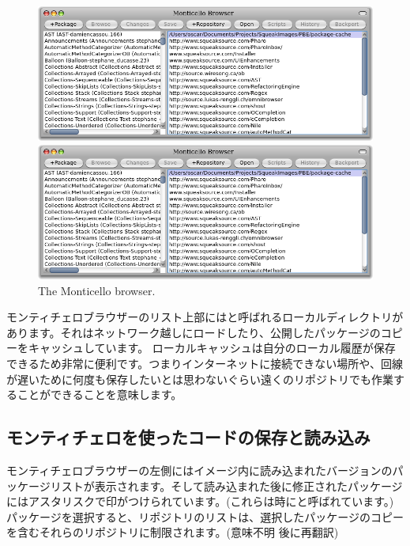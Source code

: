 \documentclass[a4paper,10pt,twoside]{book}
\begin{document}
\begin{figure}[hbt]
\ifluluelse
	{\centerline {\includegraphics[width=\textwidth]{MonticelloBrowser}}}
	{\centerline {\includegraphics[scale=0.7]{MonticelloBrowser}}}
\caption{The Monticello browser.
}
\end{figure}

モンティチェロブラウザーのリスト上部にはと呼ばれるローカルディレクトリがあります。それはネットワーク越しにロードしたり、公開したパッケージのコピーをキャッシュしています。
ローカルキャッシュは自分のローカル履歴が保存できるため非常に便利です。つまりインターネットに接続できない場所や、回線が遅いために何度も保存したいとは思わないぐらい遠くのリポジトリでも作業することができることを意味します。


\subsection{モンティチェロを使ったコードの保存と読み込み}
モンティチェロブラウザーの左側にはイメージ内に読み込まれたバージョンのパッケージリストが表示されます。そして読み込まれた後に修正されたパッケージにはアスタリスクで印がつけられています。(これらは時にと呼ばれています。) パッケージを選択すると、リポジトリのリストは、選択したパッケージのコピーを含むそれらのリポジトリに制限されます。(意味不明 後に再翻訳)

\end{document}

